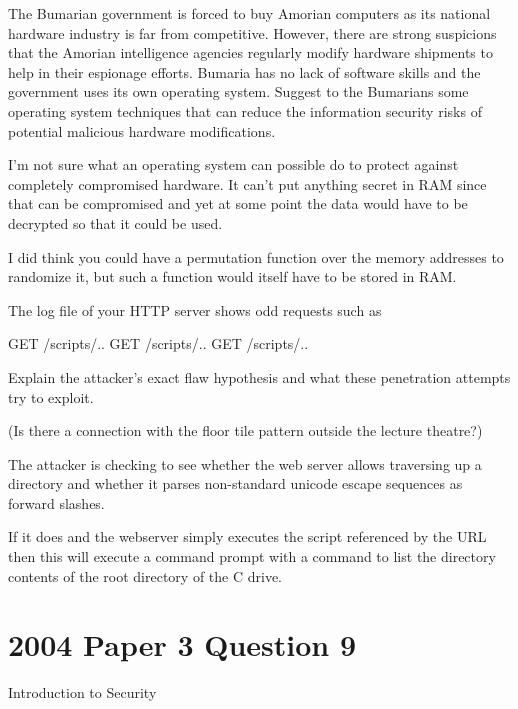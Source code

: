 \documentclass{supervision}
\begin{document}
\begin{questions}
    \question The Bumarian government is forced to buy Amorian computers as its
      national hardware industry is far from competitive. However, there are
      strong suspicions that the Amorian intelligence agencies regularly modify
      hardware shipments to help in their espionage efforts. Bumaria has no lack
      of software skills and the government uses its own operating system.
      Suggest to the Bumarians some operating system techniques that can reduce
      the information security risks of potential malicious hardware
      modifications.
      \begin{solution}
        I'm not sure what an operating system can possible do to protect against
        completely compromised hardware. It can't put anything secret in RAM
        since that can be compromised and yet at some point the data would have
        to be decrypted so that it could be used.

        I did think you could have a permutation function over the memory
        addresses to randomize it, but such a function would itself have to be
        stored in RAM.
      \end{solution}

    \question The log file of your HTTP server shows odd requests such as
      \begin{code}{{}}
        GET /scripts/..%
        GET /scripts/..%
        GET /scripts/..%
      \end{code}

      Explain the attacker’s exact flaw hypothesis and what these penetration
      attempts try to exploit.

      (Is there a connection with the floor tile pattern outside the lecture
      theatre?)
      \begin{solution}
        The attacker is checking to see whether the web server allows traversing
        up a directory and whether it parses non-standard unicode escape
        sequences as forward slashes.

        If it does and the webserver simply executes the script referenced by
        the URL then this will execute a command prompt with a command to list
        the directory contents of the root directory of the C drive.
      \end{solution}

    \section*{2004 Paper 3 Question 9}
    \question Introduction to Security
      \begin{parts}

\end{parts}
\end{questions}
\end{document}
